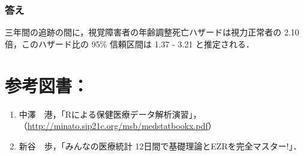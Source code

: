 \documentclass[11pt,]{problemset}
\providecommand{\tightlist}{%
  \setlength{\itemsep}{0pt}\setlength{\parskip}{0pt}}
\begin{document}
\hypertarget{-9}{%
\subsubsection{答え}\label{-9}}

三年間の追跡の間に，視覚障害者の年齢調整死亡ハザードは視力正常者の 2.10
倍，このハザード比の 95\% 信頼区間は 1.37 - 3.21 と推定される．

\newpage
\vfill

\section{参考図書：}

\begin{enumerate}
\def\labelenumi{\arabic{enumi}.}
\tightlist
\item
  中澤　港，「Rによる保健医療データ解析演習」，（\url{http://minato.sip21c.org/msb/medstatbookx.pdf}）
\item
  新谷　歩，「みんなの医療統計 12日間で基礎理論とEZRを完全マスター!」．
\end{enumerate}
\end{document}
